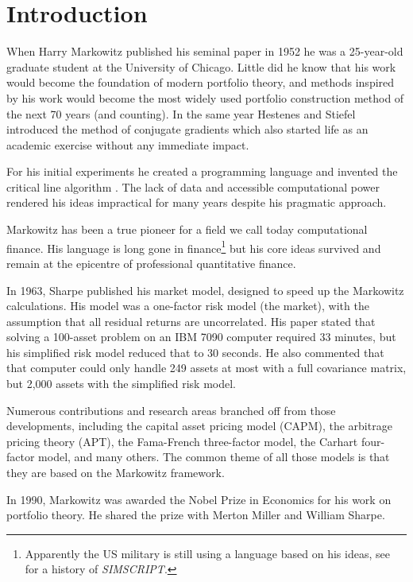 \section{Introduction}

When Harry Markowitz \cite{markowitz1952portfolio} published
his seminal paper in 1952 he was a 25-year-old graduate student at
the University of Chicago.
Little did he know that his work would become the foundation of
modern portfolio theory, and methods inspired by his work
would become the most widely used portfolio construction method
of the next 70 years (and counting).
In the same year Hestenes and Stiefel introduced
the method of conjugate gradients \cite{hestenes1952} which
also started life as an academic exercise without any immediate impact.

For his initial experiments he created a programming
language and invented the critical line algorithm \cite{markowitz1955cla}.
The lack of data and accessible computational power \cite{markowitz2019aqr}
rendered his ideas impractical for many years despite his pragmatic approach.

Markowitz has been a true pioneer for a field
we call today computational finance.
His language is long gone in finance\footnote{Apparently the US military
is still using a language based on his ideas, see \cite{markowitz2019aqr} for a
history of \emph{SIMSCRIPT}.} but his core ideas
survived and remain at the epicentre of
professional quantitative finance.

In 1963, Sharpe \cite{sharpe1963} published his market model,
designed to speed up the Markowitz calculations.
His model was a one-factor risk model (the market),
with the assumption that all residual returns are
uncorrelated.
His paper stated that solving a 100-asset
problem on an IBM 7090 computer required 33 minutes,
but his simplified risk model reduced that to 30 seconds.
He also commented that that computer could only handle 249
assets at most with a full covariance matrix, but 2,000
assets with the simplified risk model.

Numerous contributions and research areas branched off from those
developments, including the capital asset pricing model (CAPM),
the arbitrage pricing theory (APT), the Fama-French three-factor model,
the Carhart four-factor model, and many others.
The common theme of all those models is that they are
based on the Markowitz framework.

In 1990, Markowitz was awarded the Nobel Prize in Economics
for his work on portfolio theory.
He shared the prize with Merton Miller and William Sharpe.

